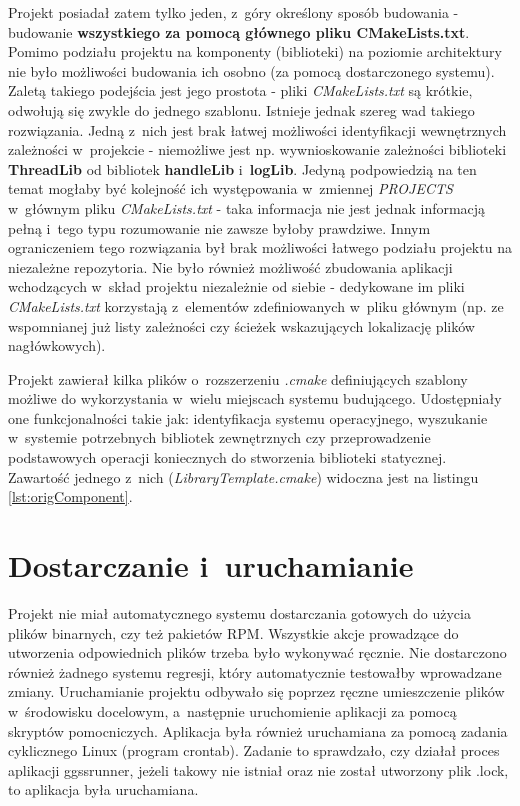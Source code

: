 Projekt posiadał zatem tylko jeden, z~góry określony sposób budowania - budowanie \textbf{wszystkiego za pomocą głównego pliku CMakeLists.txt}. Pomimo podziału projektu na komponenty (biblioteki) na poziomie architektury nie było możliwości budowania ich osobno (za pomocą dostarczonego systemu). Zaletą takiego podejścia jest jego prostota - pliki \textit{CMakeLists.txt} są krótkie, odwołują się zwykle do jednego szablonu. Istnieje jednak szereg wad takiego rozwiązania. Jedną z~nich jest brak łatwej możliwości identyfikacji wewnętrznych zależności w~projekcie - niemożliwe jest np. wywnioskowanie zależności biblioteki \textbf{ThreadLib} od bibliotek \textbf{handleLib} i~\textbf{logLib}. Jedyną podpowiedzią na ten temat mogłaby być kolejność ich występowania w~zmiennej \textit{PROJECTS} w~głównym pliku \textit{CMakeLists.txt} - taka informacja nie jest jednak informacją pełną i~tego typu rozumowanie nie zawsze byłoby prawdziwe. Innym ograniczeniem tego rozwiązania był brak możliwości łatwego podziału projektu na niezależne repozytoria. Nie było również możliwość zbudowania aplikacji wchodzących w~skład projektu niezależnie od siebie - dedykowane im pliki \textit{CMakeLists.txt} korzystają z~elementów zdefiniowanych w~pliku głównym (np. ze wspomnianej już listy zależności czy ścieżek wskazujących lokalizację plików nagłówkowych). 

Projekt zawierał kilka plików o~rozszerzeniu \textit{.cmake} definiujących szablony możliwe do wykorzystania w~wielu miejscach systemu budującego. Udostępniały one funkcjonalności takie jak: identyfikacja systemu operacyjnego, wyszukanie w~systemie potrzebnych bibliotek zewnętrznych czy przeprowadzenie podstawowych operacji koniecznych do stworzenia biblioteki statycznej. Zawartość jednego z~nich (\textit{LibraryTemplate.cmake}) widoczna jest na listingu \ref{lst:origComponent}.


\section{Dostarczanie i~uruchamianie}

Projekt nie miał automatycznego systemu dostarczania gotowych do użycia plików binarnych, czy też pakietów RPM. Wszystkie akcje prowadzące do utworzenia odpowiednich plików trzeba było wykonywać ręcznie. Nie dostarczono również żadnego systemu regresji, który automatycznie testowałby wprowadzane zmiany. Uruchamianie projektu odbywało się poprzez ręczne umieszczenie plików w~środowisku docelowym, a~następnie uruchomienie aplikacji za pomocą skryptów pomocniczych. Aplikacja była również uruchamiana za pomocą zadania cyklicznego Linux (program crontab). Zadanie to sprawdzało, czy działał proces aplikacji ggssrunner, jeżeli takowy nie istniał oraz nie został utworzony plik .lock, to aplikacja była uruchamiana.


